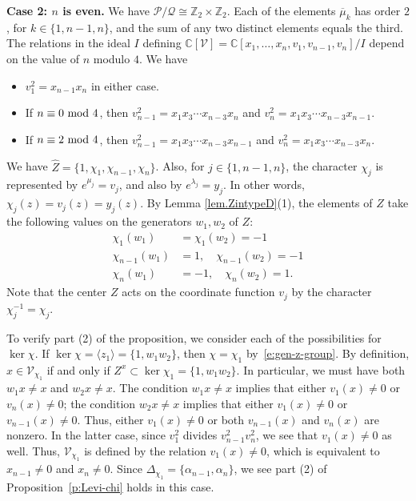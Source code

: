 \documentclass[reqno,11pt]{amsart}
\theoremstyle{remark}
\theoremstyle{remark}
\theoremstyle{definition}
\theoremstyle{definition}
\theoremstyle{definition}
\numberwithin{equation}{section}
\newcommand{\C}{\mathbb{C}}           %
\newcommand{\Z}{\mathbb{ Z}}           %
\renewcommand{\ker}{\operatorname{ker }}
\newcommand{\ga}{\alpha}
\newcommand{\cp}{\mathcal{P}}
\newcommand{\cq}{\mathcal{Q}}
\newcommand{\toric}{\mathcal{V}}
\renewcommand{\hat}{\widehat}
\begin{document}
\textbf{Case 2: $n$ is even.} We have $\cp/\cq \cong \Z_2 \times \Z_2$. Each of the elements $\overline{\mu}_k$ has order $2$, for $k\in \{1,n-1,n\}$, and the sum of any two distinct elements equals the third.  The relations  in the ideal $I$ defining $\C[\toric] = \C[x_1, \ldots, x_n, v_1, v_{n-1}, v_{n}]/I$ depend on the value of $n$ modulo $4$.  We have
\begin{itemize}
\item $v_1^2  =  x_{n-1} x_n$ in either case.
\item If $n \equiv 0 \textup{ mod }4$, then $v_{n-1}^2  = x_1 x_3 \cdots x_{n-3} x_n$ and $v_n^2  = x_1 x_3 \cdots x_{n-3} x_{n-1}$.
\item If $n \equiv 2 \textup{ mod }4$, then $v_{n-1}^2  = x_1 x_3 \cdots x_{n-3} x_{n-1}$ and $v_n^2  = x_1 x_3 \cdots x_{n-3} x_n$. 
\end{itemize}
We have $\hat{Z} = \{ 1, \chi_1, \chi_{n-1}, \chi_n \}$.  Also, for $j \in \{1, n-1, n \}$, the character $\chi_j$ is represented by $e^{\mu_j} = v_j$, and also by
$e^{\lambda_j} = y_j$.  In other words, $\chi_j(z) = v_j(z) = y_j(z)$.  By Lemma \ref{lem.ZintypeD}(1), 
the elements of $\hat{Z}$ take the following values on the generators $w_1, w_2$ of $Z$:
\begin{equation} \label{e:gen-z-group}
\begin{aligned}
  \chi_1(w_1) &= \chi_1(w_2) = -1 \\
  \chi_{n-1}(w_1) &= 1, \quad \chi_{n-1}(w_2) = -1 \\
  \chi_n(w_1) &= -1, \quad \chi_n(w_2)= 1.
\end{aligned}
\end{equation}
Note that the center $Z$ acts on the coordinate function $v_j$ by the character $\chi_j^{-1} = \chi_j$.

To verify part (2) of the proposition, we consider each of the possibilities for $\ker \chi$.  
If $\ker \chi =  \langle z_1 \rangle = \{1, w_1 w_2 \} $, then $\chi = \chi_1$ by~\eqref{e:gen-z-group}.  By definition, $x \in \toric_{\chi_1}$ if and only if $Z^x \subset \ker \chi_1 = \{1, w_1 w_2 \}$.  In particular, we must have both $w_1 x\neq x$ and $w_2x\neq x$. The condition $w_1 x \neq x$ implies that either $v_1(x) \neq 0$ or $v_n(x) \neq 0$; the condition $w_2 x \neq x$ implies that either $v_1(x) \neq 0$ or $v_{n-1}(x) \neq 0$.  Thus, either $v_1(x) \neq 0$ or both $v_{n-1}(x)$ and $v_n(x)$ are nonzero.
In the latter case, since $v_1^2$ divides $v_{n-1}^2 v_n^2$, we see that $v_1(x) \neq 0$ as well.  Thus, $\toric_{\chi_1}$ is defined by
the relation $v_1(x) \neq 0$, which is equivalent to $x_{n-1} \neq 0$ and $x_n \neq 0$.  Since $\Delta_{\chi_1} = \{ \ga_{n-1}, \ga_n \}$, we see
part (2) of Proposition~\ref{p:Levi-chi} holds in this case.
\end{document}
